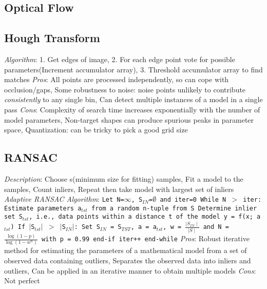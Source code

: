 \documentclass{article}
\begin{document}
\begin{multicols*}{2}
        \subsection*{Optical Flow}
        \subsection*{Hough Transform}
        \textit{Algorithm}: 1. Get edges of image, 2. For each edge point vote for possible parameters(Increment
        accumulator array), 3. Threshold accumulator array to find matches\newline
        \textit{Pros}: All points are processed independently, so can cope with occlusion/gaps, Some robustness to
        noise: noise points unlikely to contribute \textit{consistently} to any single bin, Can detect multiple
        instances of a model in a single pass\newline
        \textit{Cons}: Complexity of search time increases exponentially with the number of model parameters,
        Non-target shapes can produce spurious peaks in parameter space, Quantization: can be tricky to pick a good
        grid size\newline
        \subsection*{RANSAC}
        \textit{Description}: Choose s(minimum size for fitting) samples, Fit a model to the samples, Count inliers,
        Repeat then take model with largest set of inliers\newline
        \textit{Adaptive RANSAC Algorithm}:
        \texttt{Let N=$\infty$, S$_{IN}$=$\emptyset$ and iter=0\newline
        While N $>$ iter:\newline
        Estimate parameters a$_{tst}$ from a random n-tuple from S\newline
        Determine inlier set S$_{tst}$, i.e., data points within a distance t of the model y = f(x; a$_{tst}$)\newline
        If $\mid$S$_{tst}$$\mid$ $>$ $\mid$S$_{IN}$$\mid$:\newline
        Set S$_{IN}$ = S$_{TST}$, a = a$_{tst}$, w = $\frac{\mid S_{IN}\mid}{\mid S\mid}$ and N =
            $\frac{\log(1-p)}{\log(1-w^n)}$ with p = 0.99\newline
            end-if\newline
            iter++\newline
            end-while}\newline
        \textit{Pros}: Robust iterative method for estimating the parameters of a mathematical model from a set of
        observed data containing outliers, Separates the observed data into inliers and outliers, Can be applied in an
        iterative manner to obtain multiple models\newline
        \textit{Cons}: Not perfect\newline

\end{multicols*}
\end{document}
